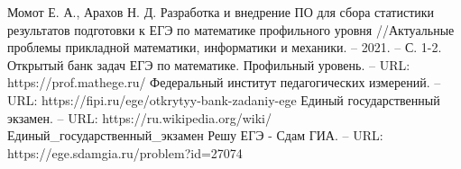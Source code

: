 \begin{thebibliography}{5}
	 Момот Е. А., Арахов Н. Д. Разработка и внедрение ПО для сбора статистики результатов подготовки к ЕГЭ по математике профильного уровня //Актуальные проблемы прикладной математики, информатики и механики. – 2021. – С. 1-2.
	Открытый банк задач ЕГЭ по математике. Профильный уровень. – URL:  https://prof.mathege.ru/
	Федеральный институт педагогических измерений. – URL:  https://fipi.ru/ege/otkrytyy-bank-zadaniy-ege
	 Единый государственный экзамен. – URL:  https://ru.wikipedia.org/wiki/Единый\_государственный\_экзамен
	Решу ЕГЭ - Сдам ГИА. – URL: https://ege.sdamgia.ru/problem?id=27074
\end{thebibliography}